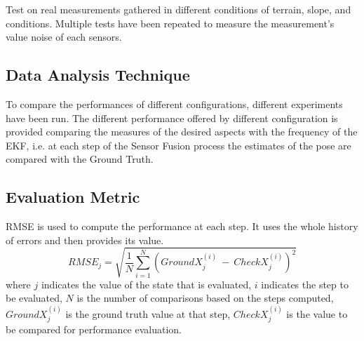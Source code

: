 Test on real measurements gathered in different conditions of terrain, slope, and conditions.
Multiple tests have been repeated to measure the measurement's value noise of each sensors.



\subsection{Data Analysis Technique}

\noindent To compare the performances of different configurations, different experiments have been run.
The different performance offered by different configuration is provided comparing the measures of the desired aspects with the frequency of the \gls{EKF}, i.e. at each step of the Sensor Fusion process the estimates of the pose are compared with the Ground Truth.



\subsection{Evaluation Metric}

\noindent \gls{RMSE} is used to compute the performance at each step.
It uses the whole history of errors and then provides its value.
\begin{equation}
    RMSE_j = \sqrt{ \frac{1}{N}\sum_{i=1}^{N} (GroundX_j^{(i)}~-~CheckX_j^{(i)})^2}
\end{equation}
where $j$ indicates the value of the state that is evaluated, $i$ indicates the step to be evaluated, $N$ is the number of comparisons based on the steps computed, $GroundX_j^{(i)}$ is the ground truth value at that step, $CheckX_j^{(i)}$ is the value to be compared for performance evaluation.

